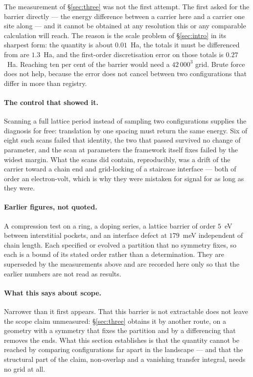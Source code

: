 \documentclass[11pt]{article}
\begin{document}
The measurement of \S\ref{sec:three} was not the first attempt. The first asked for the barrier
directly --- the energy difference between a carrier here and a carrier one site along --- and it
cannot be obtained at any resolution this or any comparable calculation will reach. The reason is the
scale problem of \S\ref{sec:intro} in its sharpest form: the quantity is about $0.01$~Ha, the totals
it must be differenced from are $1.3$~Ha, and the first-order discretisation error on those totals is
$0.27$~Ha. Reaching ten per cent of the barrier would need a $42\,000^3$ grid. Brute force does not
help, because the error does not cancel between two configurations that differ in more than registry.

\paragraph{The control that showed it.} Scanning a full lattice period instead of sampling two
configurations supplies the diagnosis for free: translation by one spacing must return the same
energy. Six of eight such scans failed that identity, the two that passed survived no change of
parameter, and the scan at parameters the framework itself fixes failed by the widest margin. What
the scans did contain, reproducibly, was a drift of the carrier toward a chain end and grid-locking
of a staircase interface --- both of order an electron-volt, which is why they were mistaken for
signal for as long as they were.

\paragraph{Earlier figures, not quoted.} A compression test on a ring, a doping series, a lattice
barrier of order $5$~eV between interstitial pockets, and an interface defect at $179$~meV
independent of chain length. Each specified or evolved a partition that no symmetry fixes, so each is
a bound of its stated order rather than a determination. They are superseded by the measurements
above and are recorded here only so that the earlier numbers are not read as results.

\paragraph{What this says about scope.} Narrower than it first appears. That this barrier is not
extractable does not leave the scope claim unmeasured: \S\ref{sec:three} obtains it by another route,
on a geometry with a symmetry that fixes the partition and by a differencing that removes the ends.
What this section establishes is that the quantity cannot be reached by comparing configurations far
apart in the landscape --- and that the structural part of the claim, non-overlap and a vanishing
transfer integral, needs no grid at all.
\end{document}
